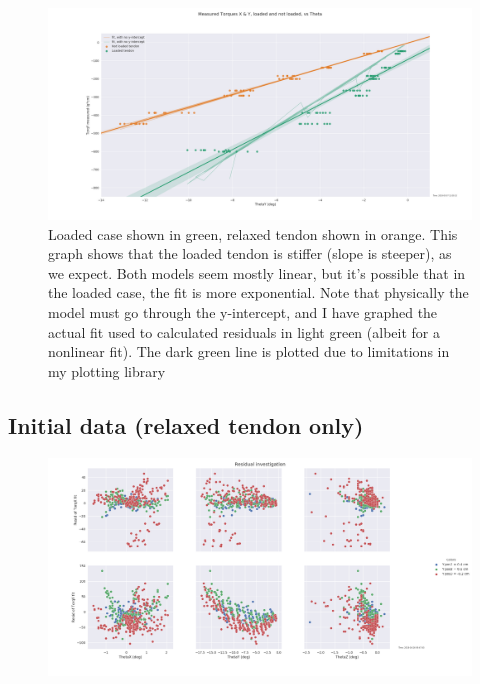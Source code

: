 \documentclass[12pt]{article}
\begin{document}
\begin{figure}[H]
\centering
\includegraphics[width=.9\textwidth]{images/stiff/GOODStiffnessComparison.png}
\caption{Loaded case shown in green, relaxed tendon shown in orange. This graph shows that the
loaded tendon is stiffer (slope is steeper), as we expect. Both models seem mostly linear, but it's
possible that in the loaded case, the fit is more exponential. Note that physically the model must
go through the y-intercept, and I have graphed the actual fit used to calculated residuals in light
green (albeit for a nonlinear fit). The dark green line is plotted due to limitations in my plotting
library}
\end{figure}

\subsection{Initial data (relaxed tendon only)}

\begin{figure}[H]
\centering
\includegraphics[width=1.1\textwidth]{images/round1/LinearResid_thetaY.png}
\end{figure}
\end{document}
